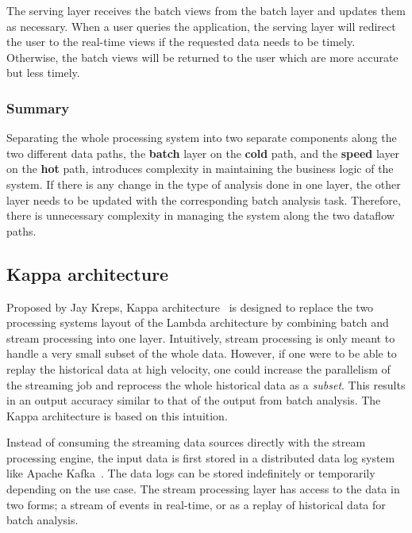 The serving layer receives the batch views from the batch layer and updates them as necessary. When a user 
queries the application, the serving layer will redirect the user to the real-time views if the 
requested data needs to be timely. Otherwise, the batch views will be returned to the user which are 
more accurate but less timely.  


\subsubsection{Summary}%
\label{ssub:Summary}

Separating the whole processing system into two separate components along 
the two different data paths, the \textbf{batch} layer on the \textbf{cold} path, and 
the \textbf{speed} layer on the \textbf{hot} path, introduces complexity in maintaining the business logic of the system.
If 
there is any change in the type of analysis done in one layer, the other layer needs to be updated 
with the corresponding batch analysis task. Therefore, there is unnecessary complexity in managing 
the system along the two dataflow paths. 
    

\subsection{Kappa architecture}%
\label{sub:Kappa architecture}
Proposed by Jay Kreps, Kappa architecture~\cite{kappa_architecture} is designed to replace the 
two processing systems layout of the Lambda architecture by combining batch and stream processing 
into one layer. Intuitively, stream processing is 
only meant to handle a very small subset of the whole data. However, if one were to be able 
to replay the historical data at high velocity, one could increase the parallelism of the streaming 
job and reprocess the whole historical data as a \emph{subset}. This results in an output accuracy similar
to that of the output from batch analysis. The Kappa architecture is based on this intuition.   

Instead of consuming the streaming data sources directly with the stream processing engine, 
the input data is first stored in a distributed data log system like Apache Kafka~\cite{kafka}. The data 
logs can be stored indefinitely or temporarily depending on the use case.
The stream processing layer has access to the data in two forms; 
a stream of events in real-time, or as a replay of historical data for batch analysis. 

